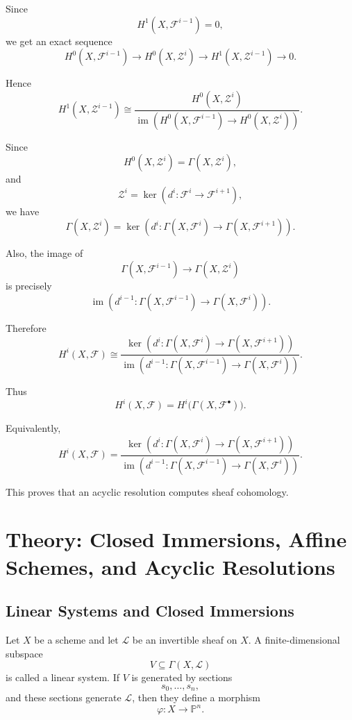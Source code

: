 \documentclass[12pt,a4paper]{article}
\theoremstyle{notespace}
\begin{document}
Since
\[
H^1(X,\mathcal F^{i-1})=0,
\]
we get an exact sequence
\[
H^0(X,\mathcal F^{i-1})
\to H^0(X,\mathcal Z^i)
\to H^1(X,\mathcal Z^{i-1})
\to 0.
\]

Hence
\[
H^1(X,\mathcal Z^{i-1})
\cong
\frac{
	H^0(X,\mathcal Z^i)
}{
	\operatorname{im}\left(
	H^0(X,\mathcal F^{i-1})
	\to H^0(X,\mathcal Z^i)
	\right)
}.
\]

Since
\[
H^0(X,\mathcal Z^i)
=
\Gamma(X,\mathcal Z^i),
\]
and
\[
\mathcal Z^i=\ker(d^i:\mathcal F^i\to \mathcal F^{i+1}),
\]
we have
\[
\Gamma(X,\mathcal Z^i)
=
\ker\left(
d^i:\Gamma(X,\mathcal F^i)\to \Gamma(X,\mathcal F^{i+1})
\right).
\]

Also, the image of
\[
\Gamma(X,\mathcal F^{i-1})
\to
\Gamma(X,\mathcal Z^i)
\]
is precisely
\[
\operatorname{im}\left(
d^{i-1}:\Gamma(X,\mathcal F^{i-1})
\to \Gamma(X,\mathcal F^i)
\right).
\]

Therefore
\[
H^i(X,\mathcal F)
\cong
\frac{
	\ker\left(
	d^i:\Gamma(X,\mathcal F^i)\to \Gamma(X,\mathcal F^{i+1})
	\right)
}{
	\operatorname{im}\left(
	d^{i-1}:\Gamma(X,\mathcal F^{i-1})\to \Gamma(X,\mathcal F^i)
	\right)
}.
\]

Thus
\[
\boxed{
	H^i(X,\mathcal F)
	=
	H^i\bigl(\Gamma(X,\mathcal F^\bullet)\bigr).
}
\]

Equivalently,
\[
\boxed{
	H^i(X,\mathcal F)
	=
	\frac{
		\ker\left(
		d^i:\Gamma(X,\mathcal F^i)\to \Gamma(X,\mathcal F^{i+1})
		\right)
	}{
		\operatorname{im}\left(
		d^{i-1}:\Gamma(X,\mathcal F^{i-1})\to \Gamma(X,\mathcal F^i)
		\right)
	}.
}
\]

This proves that an acyclic resolution computes sheaf cohomology.


\section{Theory: Closed Immersions, Affine Schemes, and Acyclic Resolutions}

\subsection{Linear Systems and Closed Immersions}

Let \(X\) be a scheme and let \(\mathcal L\) be an invertible sheaf on \(X\). A finite-dimensional subspace
\[
V\subseteq \Gamma(X,\mathcal L)
\]
is called a linear system. If \(V\) is generated by sections
\[
s_0,\dots,s_n,
\]
and these sections generate \(\mathcal L\), then they define a morphism
\[
\varphi:X\to \mathbb P^n.
\]
\end{document}
